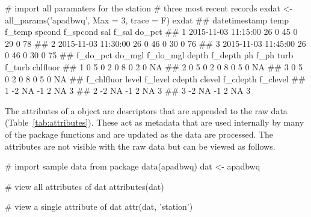 \begin{example}
# import all paramaters for the station
# three most recent records
exdat <- all_params('apadbwq', Max = 3, trace = F)
exdat
##         datetimestamp temp f_temp spcond f_spcond sal f_sal do_pct
## 1 2015-11-03 11:15:00   26      0     45        0  29     0     78
## 2 2015-11-03 11:30:00   26      0     46        0  30     0     76
## 3 2015-11-03 11:45:00   26      0     46        0  30     0     75
##   f_do_pct do_mgl f_do_mgl depth f_depth ph f_ph turb f_turb chlfluor
## 1        0      5        0     2       0  8    0    2      0       NA
## 2        0      5        0     2       0  8    0    5      0       NA
## 3        0      5        0     2       0  8    0    5      0       NA
##   f_chlfluor level f_level cdepth clevel f_cdepth f_clevel
## 1         -2    NA      -1      2     NA        3         
## 2         -2    NA      -1      2     NA        3         
## 3         -2    NA      -1      2     NA        3
\end{example}

The attributes of a  object are descriptors that are appended to the raw data (Table~\ref{tab:attributes}).  These act as metadata that are used internally by many of the package functions and are updated as the data are processed. The attributes are not visible with the raw data but can be viewed as follows.

\begin{example}
# import sample data from package
data(apadbwq)
dat <- apadbwq

# view all attributes of dat
attributes(dat)
 
# view a single attribute of dat
attr(dat, 'station')
\end{example}
 
